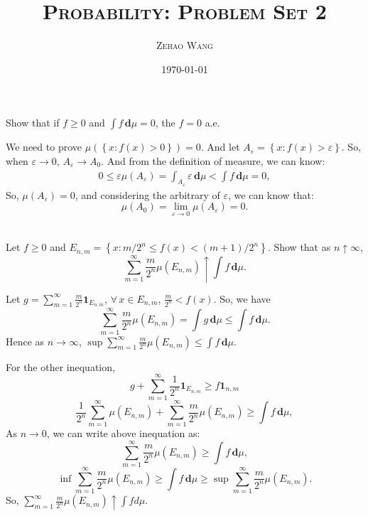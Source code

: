 \documentclass[en, normal, 11pt, black]{elegantnote}
\title{\textsc{Probability: Problem Set 2}}
\author{\textsc{Zehao Wang}}
\date{\today}
\newenvironment{exercise}[1]{\begin{tcolorbox}[colback=black!15, colframe=black!80, breakable, title=#1]}{\end{tcolorbox}}
\renewenvironment{proof}{\begin{tcolorbox}[colback=white, colframe=black!50, breakable, title=Proof. ]\setlength{\parskip}{0.8em}}{\\\rightline{$\square$}\end{tcolorbox}}
\newcommand{\der}{\,\mathbf{d}}
\begin{document}
\maketitle
    \begin{exercise}{1.4.1}
        Show that if $f\geqslant0$ and $\int f\der \mu=0$, the $f=0$ a.e. 
    \end{exercise}
    \begin{proof}
        We need to prove $\mu\left(\left\{x:f(x)>0\right\}\right)=0$. And let $A_\varepsilon=\left\{x:f(x)>\varepsilon\right\}$. So, when $\varepsilon\to0$, $A_\varepsilon\to A_0$. 
        And from the definition of measure, we can know: 
        \begin{align*}
            0\leqslant\varepsilon\mu(A_\varepsilon)=\int_{A_\varepsilon}\varepsilon\der\mu<\int f\der\mu=0, 
        \end{align*}
        So, $\mu(A_\varepsilon)=0$, and considering the arbitrary of $\varepsilon$, we can know that: 
        \[\mu(A_0)=\lim_{\varepsilon\to0}\mu(A_\varepsilon)=0. \]\vspace{-30pt}
    \end{proof}

    \begin{exercise}{1.4.2}
        Let $f \geq 0$ and $E_{n, m}=\left\{x: m / 2^{n} \leqslant f(x)<(m+1) / 2^{n}\right\}$. Show that as $n \uparrow \infty$, 
        \[
            \sum_{m=1}^{\infty} \frac{m}{2^{n}} \mu\left(E_{n, m}\right) \uparrow \int f \der \mu. 
        \]
    \end{exercise}
    \begin{proof}
        Let $g=\sum_{m=1}^\infty\frac{m}{2^n}\mathbf{1}_{E_{n,m}}$, $\forall\,x\in E_{n,m}$, $\frac{m}{2^n}<f(x)$. So, we have 
        \[
            \sum_{m=1}^\infty\frac{m}{2^n}\mu(E_{n,m})=\int g\der \mu\leqslant\int f\der \mu. 
        \]
        Hence as $n\to\infty$, $\sup \sum_{m=1}^\infty\frac{m}{2^n}\mu(E_{n,m})\leqslant \int f\der \mu$. 

        For the other inequation, 
        \[
            g+\sum_{m=1}^\infty \frac{1}{2^n}\mathbf{1}_{E_{n,m}}\geqslant f\mathbf{1}_{n,m}
        \]
        \[
            \frac{1}{2^n}\sum_{m=1}^\infty\mu(E_{n,m})+\sum_{m=1}^\infty\frac{m}{2^n}\mu(E_{n,m})\geqslant\int f\der\mu, 
        \]
        As $n\to 0$, we can write above inequation as: 
        \[
            \sum_{m=1}^\infty\frac{m}{2^n}\mu(E_{n,m})\geqslant\int f\der\mu, 
        \]
        \[
            \inf \sum_{m=1}^\infty\frac{m}{2^n}\mu(E_{n,m})\geqslant\int f\der\mu\geqslant\sup \sum_{m=1}^\infty\frac{m}{2^n}\mu(E_{n,m}). 
        \]
        So, $\sum_{m=1}^{\infty} \frac{m}{2^{n}} \mu\left(E_{n, m}\right) \uparrow \int f d \mu$. 
    \end{proof}
\end{document}
